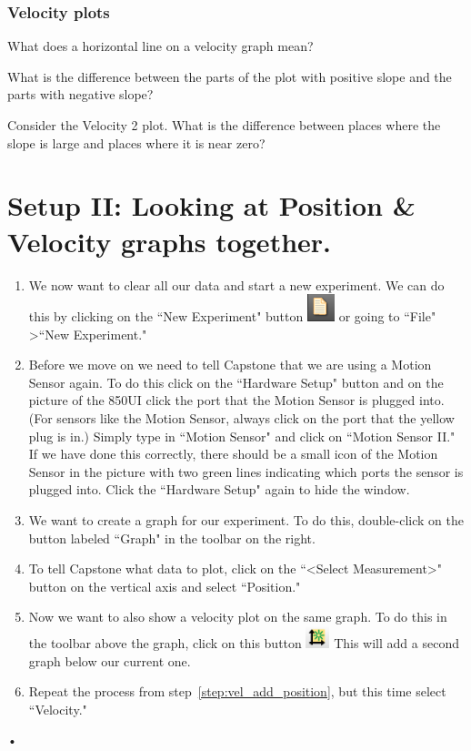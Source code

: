 \documentclass[main.tex]{subfiles}
\begin{document}
\subsubsection*{Velocity plots}
\begin{question}
What does a horizontal line on a velocity graph mean?
\end{question}
\begin{question}
What is the difference between the parts of the plot with positive slope and the parts with negative slope?
\end{question}
\begin{question}
Consider the Velocity 2 plot. What is the difference between places where the slope is large and places where it is near zero?
\end{question}

\section{Setup II: Looking at Position \& Velocity graphs together.}
\begin{enumerate}
\item
We now want to clear all our data and start a new experiment. We can do this by clicking on the ``New Experiment" button \includegraphics{New_Experiment} or going to ``File" \textgreater ``New Experiment."
\item
Before we move on we need to tell Capstone that we are using a Motion Sensor again. To do this click on the ``Hardware Setup" button and on the picture of the 850UI click the port that the Motion Sensor is plugged into. (For sensors like the Motion Sensor, always click on the port that the yellow plug is in.) Simply type in ``Motion Sensor" and click on ``Motion Sensor II." If we have done this correctly, there should be a small icon of the Motion Sensor in the picture with two green lines indicating which ports the sensor is plugged into. Click the ``Hardware Setup" again to hide the window.
\item
We want to create a graph for our experiment. To do this, double-click on the button labeled ``Graph" in the toolbar on the right.
\item\label{step:vel_add_position}
To tell Capstone what data to plot, click on the ``\textless Select Measurement\textgreater" button on the vertical axis and select ``Position."
\item
Now we want to also show a velocity plot on the same graph. To do this in the toolbar above the graph, click on this button \includegraphics{Add_New_Plot}
 This will add a second graph below our current one.
\item
Repeat the process from step~\ref{step:vel_add_position}, but this time select ``Velocity."
\end{enumerate}•
\end{document}
